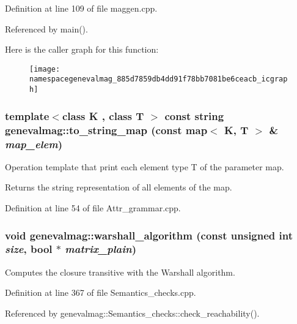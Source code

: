 Definition at line 109 of file maggen.cpp.

Referenced by main().

Here is the caller graph for this function:\nopagebreak
\begin{figure}[H]
\begin{center}
\leavevmode
\texttt{[image: namespacegenevalmag\_885d7859db4dd91f78bb7081be6ceacb\_icgraph]}
\end{center}
\end{figure}
\hypertarget{namespacegenevalmag_bdfa348edf2ec215b8dce63ebeab02e9}{
\subsubsection[{to\_\-string\_\-map}]{\setlength{\rightskip}{0pt plus 5cm}template$<$class K , class T $>$ const string genevalmag::to\_\-string\_\-map (const map$<$ K, T $>$ \& {\em map\_\-elem})}}
\label{namespacegenevalmag_bdfa348edf2ec215b8dce63ebeab02e9}


Operation template that print each element type T of the parameter map.

Returns the string representation of all elements of the map. 

Definition at line 54 of file Attr\_\-grammar.cpp.\hypertarget{namespacegenevalmag_311f0385029ff37574bbf0189064f310}{
\subsubsection[{warshall\_\-algorithm}]{\setlength{\rightskip}{0pt plus 5cm}void genevalmag::warshall\_\-algorithm (const unsigned int {\em size}, \/  bool $\ast$ {\em matrix\_\-plain})}}
\label{namespacegenevalmag_311f0385029ff37574bbf0189064f310}


Computes the closure transitive with the Warshall algorithm. 

Definition at line 367 of file Semantics\_\-checks.cpp.

Referenced by genevalmag::Semantics\_\-checks::check\_\-reachability().

